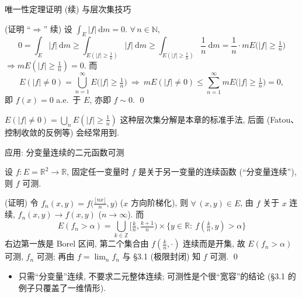 
\begin{frame}{唯一性定理证明 (续) 与层次集技巧}

\startproof[bg=yellow, fg=red](证明 ``$\Rightarrow$'' 续)
设 $\int_E |f| ~ \mathrm{d} m = 0$. $\forall\, n \in \mathbb{N}$,
\[
0 = \int_E |f| ~ \mathrm{d} m
\geqslant \int_{E(|f| \geqslant \frac{1}{n})} |f| ~ \mathrm{d} m
\geqslant \int_{E(|f| \geqslant \frac{1}{n})} \frac{1}{n} ~ \mathrm{d} m
= \frac{1}{n} \cdot m E\big(|f| \geqslant \tfrac{1}{n}\big)
\]
$\Longrightarrow mE(|f| \geqslant \frac1n) = 0$. 而
\[
E(|f| \neq 0) = \bigcup_{n=1}^{\infty} E\big(|f| \geqslant \tfrac{1}{n}\big)
\ \Longrightarrow\
m E(|f| \neq 0) \leqslant \sum_{n=1}^{\infty} m E\big(|f| \geqslant \tfrac{1}{n}\big) = 0 ,
\]
即 $f(x) = 0$ a.e.\ 于 $E$, 亦即 $f \sim 0$. \qed

\pause

\begin{attnblock}
$E(|f| \neq 0) = \bigcup_n E(|f| \geqslant \tfrac1n)$ 这种\alert{层次集分解}是本章的标准手法,
后面 (Fatou、控制收敛的反例等) 会经常用到.
\end{attnblock}

\end{frame}


\begin{frame}{应用: 分变量连续的二元函数可测}

\graymode

\begin{eg}
设 $f: E = \mathbb{R}^2 \to \mathbb{R}$, 固定任一变量时 $f$ 是关于另一变量的\alert{连续}函数
(``分变量连续''), 则 $f$ 可测.
\end{eg}

\startproof[bg=yellow, fg=red](证明)
令 $f_n(x, y) = f\big( \tfrac{\lfloor nx \rfloor}{n}, y \big)$ ($x$ 方向阶梯化), 则
$\forall\, (x,y) \in E$, 由 $f$ 关于 $x$ 连续, $f_n(x, y) \to f(x, y)$ ($n \to \infty$). 而
\[
E(f_n > \alpha)
= \bigcup_{k \in \mathbb{Z}} \Big[ \tfrac{k}{n}, \tfrac{k+1}{n} \Big) \times
\big\{ y \in \mathbb{R}:\ f(\tfrac{k}{n}, y) > \alpha \big\}
\]
右边第一族是 Borel 区间, 第二个集合由 $f(\tfrac{k}{n}, \cdot)$ 连续而是开集, 故 $E(f_n > \alpha)$
可测, $f_n$ 可测; 再由 $f = \lim_n f_n$ 与 \S 3.1 (极限封闭) 知 $f$ 可测. \qed

\normalmode

\begin{itemize}
\item 只需``分变量''连续, 不要求二元整体连续;
  可测性是个很``宽容''的结论 (\S 3.1 的例子只覆盖了一维情形).
\end{itemize}

\end{frame}

